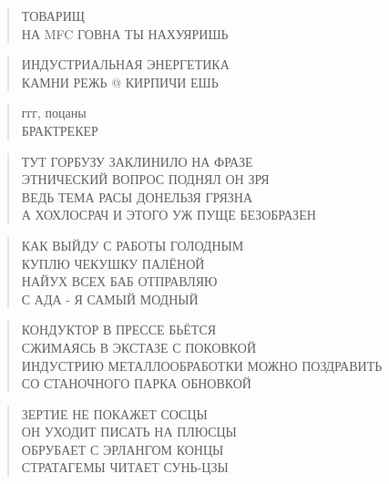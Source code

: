 \poemtitle{***}
\begin{verse}
ТОВАРИЩ\\
НА MFC ГОВНА ТЫ НАХУЯРИШЬ
\end{verse}

\poemtitle{***}
\begin{verse}
ИНДУСТРИАЛЬНАЯ ЭНЕРГЕТИКА\\
КАМНИ РЕЖЬ @ КИРПИЧИ ЕШЬ
\end{verse}

\poemtitle{***}
\begin{verse}
ггг, поцаны\\
БРАКТРЕКЕР
\end{verse}

\poemtitle{***}
\begin{verse}
ТУТ ГОРБУЗУ ЗАКЛИНИЛО НА ФРАЗЕ\\
ЭТНИЧЕСКИЙ ВОПРОС ПОДНЯЛ ОН ЗРЯ\\
ВЕДЬ ТЕМА РАСЫ ДОНЕЛЬЗЯ ГРЯЗНА\\
А ХОХЛОСРАЧ И ЭТОГО УЖ ПУЩЕ БЕЗОБРАЗЕН
\end{verse}

\poemtitle{***}
\begin{verse}
КАК ВЫЙДУ С РАБОТЫ ГОЛОДНЫМ\\
КУПЛЮ ЧЕКУШКУ ПАЛЁНОЙ\\
НАЙУХ ВСЕХ БАБ ОТПРАВЛЯЮ\\
С АДА - Я САМЫЙ МОДНЫЙ
\end{verse}

\poemtitle{***}
\begin{verse}
КОНДУКТОР В ПРЕССЕ БЬЁТСЯ\\
СЖИМАЯСЬ В ЭКСТАЗЕ С ПОКОВКОЙ\\
ИНДУСТРИЮ МЕТАЛЛООБРАБОТКИ МОЖНО ПОЗДРАВИТЬ\\
СО СТАНОЧНОГО ПАРКА ОБНОВКОЙ
\end{verse}

\poemtitle{***}
\begin{verse}
ЗЕРТИЕ НЕ ПОКАЖЕТ СОСЦЫ\\
ОН УХОДИТ ПИСАТЬ НА ПЛЮСЦЫ\\
ОБРУБАЕТ С ЭРЛАНГОМ КОНЦЫ\\
СТРАТАГЕМЫ ЧИТАЕТ СУНЬ-ЦЗЫ
\end{verse}

